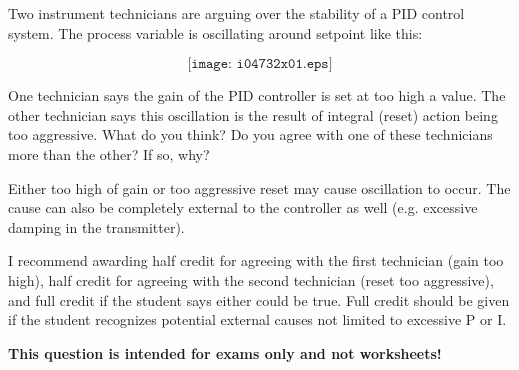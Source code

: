 

Two instrument technicians are arguing over the stability of a PID control system.  The process variable is oscillating around setpoint like this:

$$\texttt{[image: i04732x01.eps]}$$

One technician says the gain of the PID controller is set at too high a value.  The other technician says this oscillation is the result of integral (reset) action being too aggressive.  What do you think?  Do you agree with one of these technicians more than the other?  If so, why?







Either too high of gain or too aggressive reset may cause oscillation to occur.  The cause can also be completely external to the controller as well (e.g. excessive damping in the transmitter).

\vskip 10pt

I recommend awarding half credit for agreeing with the first technician (gain too high), half credit for agreeing with the second technician (reset too aggressive), and full credit if the student says either could be true.  Full credit should be given if the student recognizes potential external causes not limited to excessive P or I.







{\bf This question is intended for exams only and not worksheets!}




